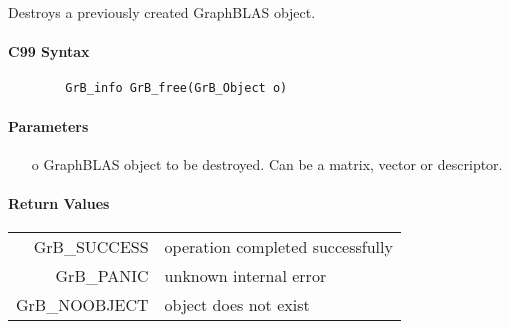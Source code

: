 Destroys a previously created GraphBLAS object.

\paragraph{C99 Syntax}

\begin{verbatim}
        GrB_info GrB_free(GrB_Object o)
\end{verbatim}


\paragraph{Parameters}

\begin{itemize}
	\item[{\sf o}] GraphBLAS object to be destroyed. Can be a matrix, vector or descriptor.
\end{itemize}

\paragraph{Return Values}

\begin{tabular}{rl}
{\sf GrB\_SUCCESS}	& operation completed successfully \\
{\sf GrB\_PANIC}	& unknown internal error \\
{\sf GrB\_NOOBJECT}	& object does not exist \\
\end{tabular}
